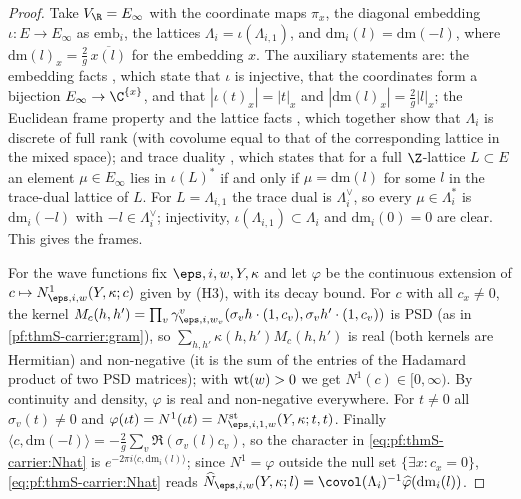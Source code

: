\begin{proof}
Take $V_\R=E_\infty$ with the coordinate maps $\pi_x$, the diagonal embedding $\iota\colon E\to E_\infty$ as
$\mathrm{emb}_i$, the lattices $\Lambda_i=\iota(\Lambda_{i,1})$, and $\mathrm{dm}_i(l)=\mathrm{dm}(-l)$, where
$\mathrm{dm}(l)_x=\frac2g\,\overline{x(l)}$ for the embedding $x$. The auxiliary statements are: the embedding facts
, which state that $\iota$ is injective, that the coordinates form a
bijection $E_\infty\to\C^{\{x\}}$, and that $|\iota(t)_x|=|t|_x$ and $|\mathrm{dm}(l)_x|=\frac2g|l|_x$; the Euclidean frame
property  and the lattice facts
, which together show that $\Lambda_i$ is discrete of full rank
(with covolume equal to that of the corresponding lattice in the mixed space); and trace duality
, which states that for a full $\Z$-lattice $L\subset E$ an element
$\mu\in E_\infty$ lies in $\iota(L)^*$ if and only if $\mu=\mathrm{dm}(l)$ for some $l$ in the trace-dual lattice of $L$.
For $L=\Lambda_{i,1}$ the trace dual is $\Lambda^\vee_i$, so every $\mu\in\Lambda_i^*$ is $\mathrm{dm}_i(-l)$ with
$-l\in\Lambda^\vee_i$; injectivity, $\iota(\Lambda_{i,1})\subset\Lambda_i$ and $\mathrm{dm}_i(0)=0$ are clear. This gives
the frames.

For the wave functions fix $\eps,i,w,Y,\kappa$ and let $\varphi$ be the continuous extension of $c\mapsto
N^1_{\eps,i,w}(Y,\kappa;c)$ given by (H3), with its decay bound. For $c$ with all $c_x\ne0$, the kernel
$M_c(h,h')=\prod_v\gamma^v_{\eps,i,w_v}(\sigma_vh\cdot(1,c_v),\sigma_vh'\cdot(1,c_v))$ is PSD (as in
\cref{pf:thmS-carrier:gram}), so $\sum_{h,h'}\kappa(h,h')M_c(h,h')$ is real (both kernels are Hermitian) and non-negative
(it is the sum of the entries of the Hadamard product of two PSD matrices); with $\operatorname{wt}(w)>0$ we get
$N^1(c)\in[0,\infty)$. By continuity and density, $\varphi$ is real and non-negative everywhere. For $t\ne0$ all
$\sigma_v(t)\ne0$ and $\varphi(\iota t)=N^1(\iota t)=\thmScarrierNst_{\eps,i,1,w}(Y,\kappa;t,t)$. Finally
$\langle c,\mathrm{dm}(-l)\rangle=-\frac2g\sum_v\Re(\sigma_v(l)c_v)$, so the character in \eqref{eq:pf:thmS-carrier:Nhat} is
$e^{-2\pi i\langle c,\mathrm{dm}_i(l)\rangle}$; since $N^1=\varphi$ outside the null set $\{\exists x:c_x=0\}$,
\eqref{eq:pf:thmS-carrier:Nhat} reads $\thmScarrierNhat_{\eps,i,w}(Y,\kappa;l)=\covol(\Lambda_i)^{-1}\widehat\varphi(
\mathrm{dm}_i(l))$.
\end{proof}

